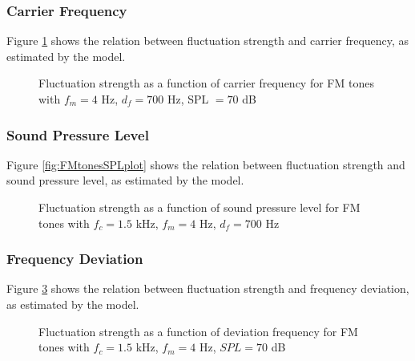 \documentclass[a4paper]{article}
\begin{document}
\subsubsection{Carrier Frequency}

Figure \ref{fig:FMtonesfcplot} shows the relation between fluctuation strength
and carrier frequency, as estimated by the model.

\begin{figure}[ht]
    \centering
    \resizebox{!}{8cm}{
        
    }
    \caption{Fluctuation strength as a function of carrier frequency for FM
        tones with $f_m = 4$ Hz, $d_f = 700$ Hz, SPL $= 70$ dB}
    \label{fig:FMtonesfcplot}
\end{figure}

\subsubsection{Sound Pressure Level}

Figure \ref{fig:FMtonesSPLplot} shows the relation between fluctuation strength
and sound pressure level, as estimated by the model.

\begin{figure}[ht]
    \centering
    \resizebox{!}{8cm}{
        
    }
    \caption{Fluctuation strength as a function of sound pressure level for FM
        tones with $f_c = 1.5$ kHz, $f_m = 4$ Hz, $d_f = 700$ Hz}
    \label{fig:AMtonesSPLplot}
\end{figure}

\subsubsection{Frequency Deviation}

Figure \ref{fig:FMtonesdfplot} shows the relation between fluctuation strength
and frequency deviation, as estimated by the model.

\begin{figure}[ht]
    \centering
    \resizebox{!}{8cm}{
        
    }
    \caption{Fluctuation strength as a function of deviation frequency for FM
        tones with $f_c = 1.5$ kHz, $f_m = 4$ Hz, $SPL = 70$ dB}
    \label{fig:FMtonesdfplot}
\end{figure}
\end{document}
